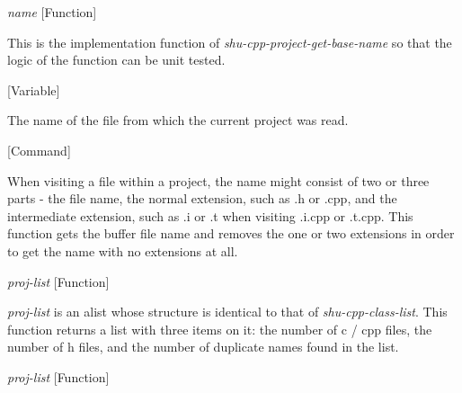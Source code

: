 \vspace{1em}
\noindent
{}
\usebox{\funcname}\emph{name}
 \hfill [Function]

\begin{doc-string}
This is the implementation function of \emph{shu-cpp-project-get-base-name} so that
the logic of the function can be unit tested.
\end{doc-string}

\vspace{1em}
\noindent
{}
\usebox{\funcname}
 \hfill [Variable]

\begin{doc-string}
The name of the file from which the current project was read.
\end{doc-string}

\vspace{1em}
\noindent
{}
\usebox{\funcname}
 \hfill [Command]

\begin{doc-string}
When visiting a file within a project, the name might consist of two or three
parts - the file name, the normal extension, such as .h or .cpp, and the
intermediate extension, such as .i or .t when visiting .i.cpp or .t.cpp.  This
function gets the buffer file name and removes the one or two extensions in
order to get the name with no extensions at all.
\end{doc-string}

\vspace{1em}
\noindent
{}
\usebox{\funcname}\emph{proj-list}
 \hfill [Function]

\begin{doc-string}
\emph{proj-list} is an alist whose structure is identical to that of \emph{shu-cpp-class-list}.
This function returns a list with three items on it: the number of c / cpp files, the
number of h files, and the number of duplicate names found in the list.
\end{doc-string}

\vspace{1em}
\noindent
{}
\usebox{\funcname}\emph{proj-list}
 \hfill [Function]


